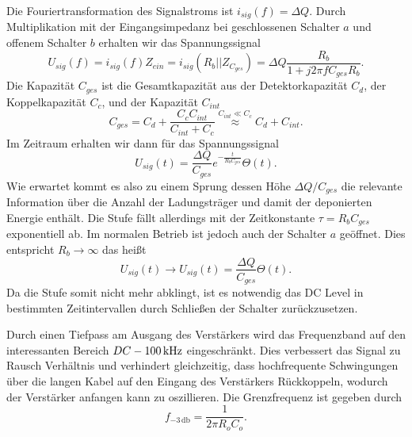 Die Fouriertransformation des Signalstroms ist $i_{sig}(f)=\Delta Q$.
Durch Multiplikation mit der Eingangsimpedanz bei geschlossenen Schalter $a$ und offenem Schalter $b$ erhalten wir das Spannungssignal
\begin{equation}
U_{sig}(f) = i_{sig}(f)Z_{ein} = i_{sig}(R_b||Z_{C_{ges}}) = \Delta Q \frac{R_b}{1 + j2\pi f C_{ges}R_b}.
\label{eq:InitialSig}
\end{equation}
Die Kapazität $C_{ges}$ ist die Gesamtkapazität aus der Detektorkapazität $C_d$, der Koppelkapazität $C_c$, und der Kapazität $C_{int}$ 
\begin{equation}
C_{ges} = C_d + \frac{C_cC_{int}}{C_{int} + C_c} \stackrel{C_{int} \ll C_c}{\approx} C_d + C_{int}.
\end{equation}
Im Zeitraum erhalten wir dann für das Spannungssignal
\begin{equation}
U_{sig}(t) = \frac{\Delta Q}{C_{ges}}e^{-\frac{t}{R_bC_{ges}}}\Theta(t).
\end{equation}
Wie erwartet kommt es also zu einem Sprung dessen Höhe $\Delta Q/C_{ges}$ die relevante Information über die Anzahl der Ladungsträger und damit der deponierten Energie enthält.
Die Stufe fällt allerdings mit der Zeitkonstante $\tau=R_bC_{ges}$ exponentiell ab.
Im normalen Betrieb ist jedoch auch der Schalter $a$ geöffnet.
Dies entspricht $R_b\rightarrow\infty$ das heißt
\begin{equation}
U_{sig}(t)\rightarrow U_{sig}(t)=\frac{\Delta Q}{C_{ges}}\Theta(t).
\end{equation}
Da die Stufe somit nicht mehr abklingt, ist es notwendig das DC Level in bestimmten Zeitintervallen durch Schließen der Schalter zurückzusetzen.

Durch einen Tiefpass am Ausgang des Verstärkers wird das Frequenzband auf den interessanten Bereich $DC \-- \SI{100}{\kilo\hertz}$ eingeschränkt.
Dies verbessert das Signal zu Rausch Verhältnis und verhindert gleichzeitig, dass hochfrequente Schwingungen über die langen Kabel auf den Eingang des Verstärkers Rückkoppeln, wodurch der Verstärker anfangen kann zu oszillieren.
Die Grenzfrequenz ist gegeben durch 
\begin{equation}
f_{-3\,\mathrm{db}} = \frac{1}{2\pi R_o C_o}.
\label{eq:AusgangTiefpass}
\end{equation}


